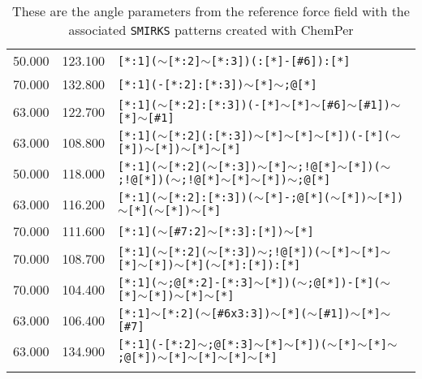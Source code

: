 \begin{longtable}{>{\baselineskip=10pt}p{} >{\baselineskip=10pt}p{} >{\baselineskip=10pt}p{}}
50.000 & 123.100 & \texttt{[*:1]($\sim$[*:2]$\sim$[*:3])(:[*]-[\#6]):[*]} \\ 
70.000 & 132.800 & \texttt{[*:1](-[*:2]:[*:3])$\sim$[*]$\sim$;@[*]} \\ 
63.000 & 122.700 & \texttt{[*:1]($\sim$[*:2]:[*:3])(-[*]$\sim$[*]$\sim$[\#6]$\sim$[\#1])$\sim$[*]$\sim$[\#1]} \\ 
63.000 & 108.800 & \texttt{[*:1]($\sim$[*:2](:[*:3])$\sim$[*]$\sim$[*]$\sim$[*])(-[*]($\sim$[*])$\sim$[*])$\sim$[*]$\sim$[*]} \\ 
50.000 & 118.000 & \texttt{[*:1]($\sim$[*:2]($\sim$[*:3])$\sim$[*]$\sim$;!@[*]$\sim$[*])($\sim$;!@[*])($\sim$;!@[*]$\sim$[*]$\sim$[*])$\sim$;@[*]} \\ 
63.000 & 116.200 & \texttt{[*:1]($\sim$[*:2]:[*:3])($\sim$[*]-;@[*]($\sim$[*])$\sim$[*])$\sim$[*]($\sim$[*])$\sim$[*]} \\ 
70.000 & 111.600 & \texttt{[*:1]($\sim$[\#7:2]$\sim$[*:3]:[*])$\sim$[*]} \\ 
70.000 & 108.700 & \texttt{[*:1]($\sim$[*:2]($\sim$[*:3])$\sim$;!@[*])($\sim$[*]$\sim$[*]$\sim$[*]$\sim$[*])$\sim$[*]($\sim$[*]:[*]):[*]} \\ 
70.000 & 104.400 & \texttt{[*:1]($\sim$;@[*:2]-[*:3]$\sim$[*])($\sim$;@[*])-[*]($\sim$[*]$\sim$[*])$\sim$[*]$\sim$[*]} \\ 
63.000 & 106.400 & \texttt{[*:1]$\sim$[*:2]($\sim$[\#6x3:3])$\sim$[*]($\sim$[\#1])$\sim$[*]$\sim$[\#7]} \\ 
63.000 & 134.900 & \texttt{[*:1](-[*:2]$\sim$;@[*:3]$\sim$[*]$\sim$[*])($\sim$[*]$\sim$[*]$\sim$;@[*])$\sim$[*]$\sim$[*]$\sim$[*]$\sim$[*]} \\ 
\caption{These are the angle parameters from the reference force field with the associated \texttt{SMIRKS} patterns created with ChemPer} 
\label{tab:protein_angle}
\end{longtable}


